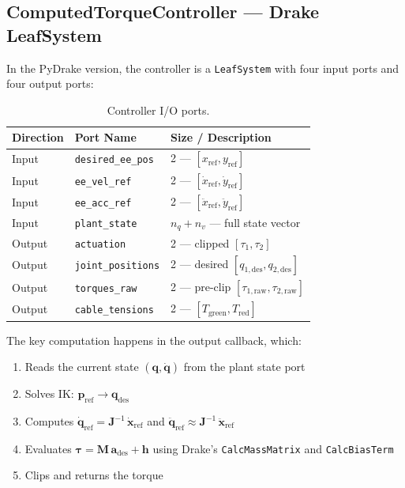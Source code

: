 \documentclass[11pt,a4paper]{article}
\newcommand{\bq}{\bm{q}}
\newcommand{\bdq}{\dot{\bm{q}}}
\newcommand{\bddq}{\ddot{\bm{q}}}
\newcommand{\btau}{\bm{\tau}}
\newcommand{\bM}{\bm{M}}
\newcommand{\bh}{\bm{h}}
\newcommand{\bJ}{\bm{J}}
\begin{document}
\subsection{ComputedTorqueController --- Drake LeafSystem}

In the PyDrake version, the controller is a \texttt{LeafSystem} with four input ports and four output ports:

\begin{table}[h]
\centering
\caption{Controller I/O ports.}
\begin{tabular}{lll}
\toprule
\textbf{Direction} & \textbf{Port Name} & \textbf{Size / Description} \\
\midrule
Input  & \texttt{desired\_ee\_pos} & 2 --- $[x_{\mathrm{ref}}, y_{\mathrm{ref}}]$ \\
Input  & \texttt{ee\_vel\_ref}     & 2 --- $[\dot x_{\mathrm{ref}}, \dot y_{\mathrm{ref}}]$ \\
Input  & \texttt{ee\_acc\_ref}     & 2 --- $[\ddot x_{\mathrm{ref}}, \ddot y_{\mathrm{ref}}]$ \\
Input  & \texttt{plant\_state}     & $n_q + n_v$ --- full state vector \\
\midrule
Output & \texttt{actuation}        & 2 --- clipped $[\tau_1, \tau_2]$ \\
Output & \texttt{joint\_positions}  & 2 --- desired $[q_{1,\mathrm{des}}, q_{2,\mathrm{des}}]$ \\
Output & \texttt{torques\_raw}      & 2 --- pre-clip $[\tau_{1,\mathrm{raw}}, \tau_{2,\mathrm{raw}}]$ \\
Output & \texttt{cable\_tensions}   & 2 --- $[T_{\mathrm{green}}, T_{\mathrm{red}}]$ \\
\bottomrule
\end{tabular}
\end{table}

The key computation happens in the output callback, which:
\begin{enumerate}[leftmargin=2em]
    \item Reads the current state $(\bq, \bdq)$ from the plant state port
    \item Solves IK: $\bm{p}_{\mathrm{ref}} \to \bq_{\mathrm{des}}$
    \item Computes $\bdq_{\mathrm{ref}} = \bJ^{-1}\,\dot{\bm{x}}_{\mathrm{ref}}$ and $\bddq_{\mathrm{ref}} \approx \bJ^{-1}\,\ddot{\bm{x}}_{\mathrm{ref}}$
    \item Evaluates $\btau = \bM\,\bm{a}_{\mathrm{des}} + \bh$ using Drake's \texttt{CalcMassMatrix} and \texttt{CalcBiasTerm}
    \item Clips and returns the torque
\end{enumerate}
\end{document}
